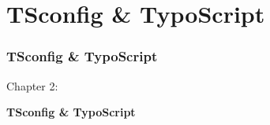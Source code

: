 %

\section{TSconfig \& TypoScript}
\begin{frame}[fragile]
	\frametitle{TSconfig \& TypoScript}

	\begin{center}\huge{Chapter 2:}\end{center}
	\begin{center}\huge{\color{typo3darkgrey}\textbf{TSconfig \& TypoScript}}\end{center}

\end{frame}


